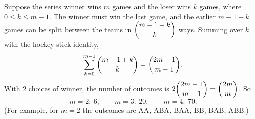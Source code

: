Suppose the series winner wins $m$ games and the loser wins $k$ games, where $0\le k\le m-1$. The winner must win the last game, and the earlier $m-1+k$ games can be split between the teams in $\dbinom{m-1+k}{k}$ ways. Summing over $k$ with the hockey-stick identity,
\[\sum_{k=0}^{m-1}\dbinom{m-1+k}{k}=\dbinom{2m-1}{m-1}.\]
With $2$ choices of winner, the number of outcomes is $2\dbinom{2m-1}{m-1}=\dbinom{2m}{m}$. So
\[m=2:\ \boxed{6},\qquad m=3:\ \boxed{20},\qquad m=4:\ \boxed{70}.\]
(For example, for $m=2$ the outcomes are AA, ABA, BAA, BB, BAB, ABB.)
